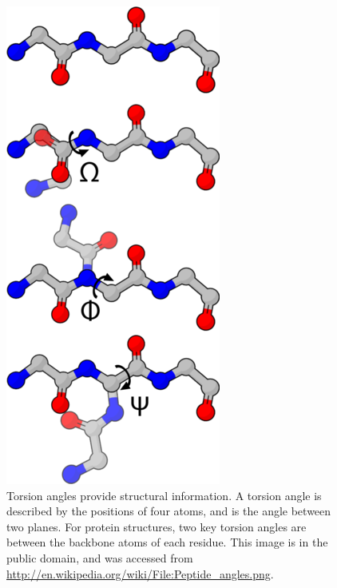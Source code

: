 \begin{figure}
  \includegraphics[scale=0.5]{figures/torsion_angles}
  \caption[Torsion angles provide structural information.]
          {Torsion angles provide structural information.
           A torsion angle is described by the positions of four
           atoms, and is the angle between two planes.  For protein
           structures, two key torsion angles are between the backbone
           atoms of each residue.
           This image is in the public domain, and was accessed
           from \url{http://en.wikipedia.org/wiki/File:Peptide_angles.png}.}
  \label{torsion_angles}
\end{figure}

